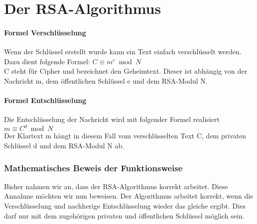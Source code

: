 \part{Der RSA-Algorithmus}
%

%

%
\subsection{Formel Verschlüsselung}
Wenn der Schlüssel erstellt wurde kann ein Text einfach verschlüsselt werden. Dazu dient folgende Formel:
$ C \equiv m^e  \bmod N $\\
C steht für Cipher und bezeichnet den Geheimtext. Dieser ist abhängig von der Nachricht m, dem öffentlichen Schlüssel e und dem RSA-Modul N.


\subsection{Formel Entschlüsselung}
Die Entschlüsselung der Nachricht wird mit folgender Formel realisiert
$ m \equiv C^d \bmod N $ \\
Der Klartext m hängt in diesem Fall vom verschlüsselten Text C, dem privaten Schlüssel d und dem RSA-Modul N ab. 
%
%
\newpage
\section{Mathematisches Beweis der Funktionsweise}
Bisher nahmen wir an, dass der RSA-Algorithmus korrekt arbeitet. Diese Annahme möchten wir nun beweisen. Der Algorithmus arbeitet korrekt, wenn die Verschlüsselung und nachherige Entschlüsselung wieder das gleiche ergibt. Dies darf nur mit dem zugehörigen privaten und öffentlichen Schlüssel möglich sein.

